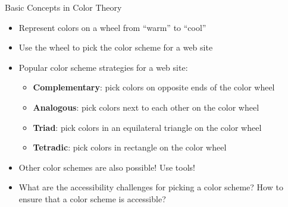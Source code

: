 \documentclass[14pt,aspectratio=169]{beamer}
\begin{document}
%
\begin{frame}{Basic Concepts in Color Theory}
  \begin{itemize}
    \item Represent colors on a wheel from ``warm'' to ``cool''
      \vspace*{-.2in}
    \item Use the wheel to pick the color scheme for a web site
      \vspace*{-.2in}
    \item Popular color scheme strategies for a web site:
      \begin{itemize}
        \item {\bf Complementary}: pick colors on opposite ends of the color
          wheel
        \item {\bf Analogous}: pick colors next to each other on the color wheel
        \item {\bf Triad}: pick colors in an equilateral triangle on the color
          wheel
        \item {\bf Tetradic}: pick colors in rectangle on the color
          wheel
      \end{itemize}
      \vspace*{-.25in}
    \item Other color schemes are also possible! Use tools!
      \vspace*{-.25in}
    \item What are the accessibility challenges for picking a color scheme? How
      to ensure that a color scheme is accessible?
  \end{itemize}
\end{frame}
\end{document}
